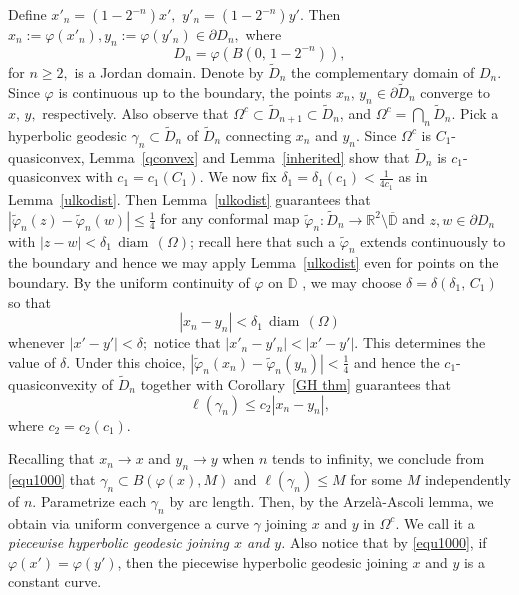 \documentclass[reqno,11pt]{amsart}
\def\wz{\widetilde}
\def\diam{{\mathop\mathrm{\,diam\,}}}
\numberwithin{equation}{section}
\theoremstyle{remark}
\begin{document}
Define
$x'_n=(1-2^{-n})x',$  
$y'_n=(1-2^{-n})y'.$ Then $x_n:=\varphi(x'_n),y_n:=\varphi(y'_n)\in \partial D_n,$
where  
$$D_n=\varphi(B(0,\,1-2^{-n})),$$ for $n\ge 2,$ is a Jordan domain.
Denote by $\wz D_n$ the complementary domain of $D_n$.
Since $\varphi$
is continuous up to the boundary, the points
$x_n,\,y_n\in \partial \wz D_n$ converge to $x,\,y,$
respectively.
Also observe that $ \Omega^c\subset \wz D_{n+1}\subset\wz D_n$, 
and $\Omega^c=\bigcap_n 
\wz D_n.$  
Pick a hyperbolic geodesic $\gamma_n\subset \wz D_n$ of $\wz D_n$ connecting 
$ x_n $ and $ y_n.$  
Since $\Omega^c$ is $C_1$-quasiconvex, Lemma~\ref{qconvex} and Lemma~\ref{inherited} show that
$\wz D_n$ is $c_1$-quasiconvex with $c_1=c_1(C_1).$ We now fix
$\delta_1=\delta_1(c_1)<\frac 1 {4c_1}$ as in Lemma~\ref{ulkodist}. Then Lemma~\ref{ulkodist}
guarantees that $|\wz \varphi_n (z)-\wz \varphi_n (w)|\le  \frac {1}{4}$ for any 
conformal map $\wz \varphi_n\colon\wz D_n\to \mathbb R^2\setminus \overline{\mathbb D}$
and $z,w\in \partial D_n$ with $|z-w|<\delta_1\diam(\Omega)$;  
recall here that such a $\wz \varphi_n$ extends continuously to the boundary
and hence we may apply Lemma~\ref{ulkodist} even for points on the boundary.
By the uniform continuity of $\varphi$ on $\mathbb D$  \cite[Page 100, Corollary 5.3]{P1992},
we may choose $\delta=\delta(\delta_1,\,C_1)$ so that
$$|x_n-y_n|<\delta_1 \diam(\Omega)$$
whenever $|x'-y'|<\delta;$ notice that $|x'_n-y'_n|<|x'-y'|.$ This determines the 
value of $\delta.$ Under this choice, 
$|\wz \varphi_n (x_n)-\wz \varphi_n (y_n)|<\frac 1 {4}$
and hence the $c_1$-quasiconvexity of $\wz D_n$ together with
Corollary~\ref{GH thm}
guarantees that
\begin{equation}\label{equ1000}
\ell(\gamma_n)\le c_2 |x_n-y_n|,
\end{equation}
where $c_2=c_2(c_1).$ 


Recalling that $x_n\to x $ and $y_n\to  y $
when $n$ tends to infinity, we conclude from \eqref{equ1000} that $\gamma_n\subset B(\varphi(x),M)$
and $\ell(\gamma_n)\le M$ for some $M$ independently of $n.$
Parametrize each $\gamma_n$ by arc length. Then, by the  
Arzel\`a-Ascoli lemma, we obtain via uniform convergence a curve 
$\gamma$ joining 
$ x $ and $ y$ in $\Omega^c.$ We call it a 
{\it piecewise hyperbolic geodesic joining $ x $ and $ y $.} 
Also notice that by \eqref{equ1000}, if $\varphi(x')=\varphi(y')$, then  the piecewise hyperbolic geodesic joining $ x $ and $ y $ is  a constant curve.
\end{document}
